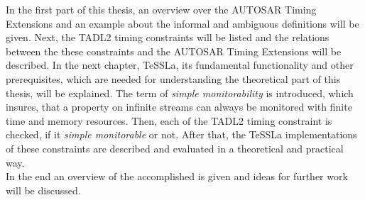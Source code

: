 	In the first part of this thesis, an overview over the AUTOSAR Timing Extensions and an example about the informal and ambiguous definitions  will be given. Next, the TADL2 timing constraints will be listed and the relations between the these constraints and the AUTOSAR Timing Extensions will be described.
	In the next chapter, TeSSLa, its fundamental functionality and other prerequisites, which are needed for understanding the theoretical part of this thesis, will be explained.
	The term of \emph{simple monitorability} is introduced, which insures, that a property on infinite streams can always be monitored with finite time and memory resources.
	Then, each of the TADL2 timing constraint is checked, if it \textit{simple monitorable} or not. After that, the TeSSLa implementations of these constraints are described and evaluated in a theoretical and practical way.\\
	In the end an overview of the accomplished is given and ideas for further work will be discussed.